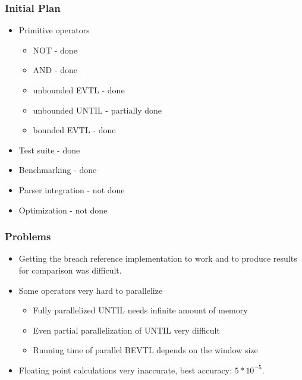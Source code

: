 \documentclass{beamer}
\begin{document}
\begin{frame}
\frametitle{Initial Plan}
\begin{itemize}
\item Primitive operators
\begin{itemize}
\item NOT - done
\item AND - done
\item unbounded EVTL - done
\item unbounded UNTIL - partially done
\item bounded EVTL - done
\end{itemize}
\item Test suite - done
\item Benchmarking - done
\item Parser integration - not done
\item Optimization - not done
\end{itemize}
\end{frame}

\begin{frame}
\frametitle{Problems}
\begin{itemize}
\item Getting the breach reference implementation to work and to produce results for
        comparison was difficult.
\item Some operators very hard to parallelize
\begin{itemize}
\item Fully parallelized UNTIL needs infinite amount of memory
\item Even partial parallelization of UNTIL very difficult
\item Running time of parallel BEVTL depends on the window size
\end{itemize}
\item Floating point calculations very inaccurate, best accuracy: $5*10^{-5}$.
\end{itemize}
\end{frame}
\end{document}
